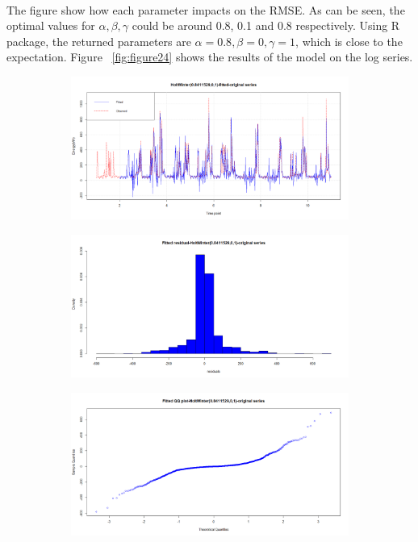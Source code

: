 \documentclass[12pt]{article}
\begin{document}
\paragraph{}
The figure show how each parameter impacts on the RMSE. As can be seen, the optimal values for $\alpha, \beta, \gamma$ could be around 0.8, 0.1 and 0.8 respectively. Using R package, the returned parameters are $\alpha=0.8,\beta=0,\gamma=1$, which is close to the expectation. Figure ~\ref{fig:figure24} shows the results of the model on the log series.
\begin{figure}[H]
  \centering
  \begin{subfigure}[b]{0.6\linewidth}
    \includegraphics[width=\linewidth]{figure23-1.png}
  \end{subfigure}
  \begin{subfigure}[b]{0.6\linewidth}
    \includegraphics[width=\linewidth]{figure23-2.png}
  \end{subfigure}
  \begin{subfigure}[b]{0.6\linewidth}
    \includegraphics[width=\linewidth]{figure23-3.png}

\end{subfigure}
\end{figure}
\end{document}
